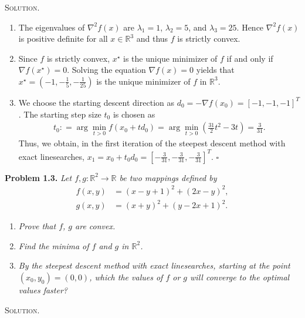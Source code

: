 \documentclass[a4paper]{article}
\numberwithin{equation}{section}
\begin{document}
\textsc{Solution.}
\begin{enumerate}
\item The eigenvalues of ${\nabla ^2}f\left( x \right)$ are $\lambda _1=1$, $\lambda _2=5$, and $\lambda _3=25$. Hence ${\nabla ^2}f\left( x \right)$ is positive definite for all $x\in \mathbb{R}^3$ and thus $f$ is strictly convex.
\item Since $f$ is strictly convex, $x^\star$ is the unique minimizer of $f$ if and only if $\nabla f\left( {{x^\star}} \right) = 0$. Solving the equation $\nabla f\left( x \right) = 0$ yields that $x^\star = \left(-1,-\frac{1}{5},-\frac{1}{25}\right)$ is the unique minimizer of $f$ in $\mathbb{R}^3$. 
\item We choose the starting descent direction as ${d_0} =  - \nabla f\left( {{x_0}} \right) = {\left[ { - 1, - 1, - 1} \right]^T}$. The starting step size $t_0$ is chosen as 
\begin{align}
{t_0}: = \arg {\min _{t > 0}}f\left( {{x_0} + t{d_0}} \right) = \arg \mathop {\min }\limits_{t > 0} \left( {\frac{{31}}{2}{t^2} - 3t} \right) = \frac{3}{{31}}.
\end{align}
Thus, we obtain, in the first iteration of the steepest descent method with exact linesearches, ${x_1} = {x_0} + {t_0}{d_0} = {\left[ { - \frac{3}{{31}}, - \frac{3}{{31}}, - \frac{3}{{31}}} \right]^T}$. \hfill $\square$
\end{enumerate}
\textbf{Problem 1.3.} \textit{Let $f,g: \mathbb{R}^2\to \mathbb{R}$ be two mappings defined by}
\begin{align}
f\left( {x,y} \right) &= {\left( {x - y + 1} \right)^2} + {\left( {2x - y} \right)^2},\\
g\left( {x,y} \right) &= {\left( {x + y} \right)^2} + {\left( {y - 2x + 1} \right)^2}.
\end{align}
\begin{enumerate}
\item \textit{Prove that $f$, $g$ are convex.}
\item \textit{Find the minima of $f$ and $g$ in $\mathbb{R}^2$.}
\item \textit{By the steepest descent method with exact linesearches, starting at the point $\left(x_0,y_0\right) =\left(0,0\right)$, which the values of $f$ or $g$ will converge to the optimal values faster?}
\end{enumerate}
\textsc{Solution.}
\end{document}
